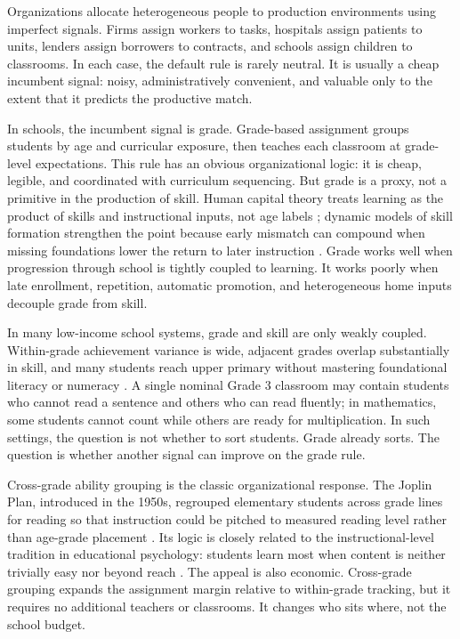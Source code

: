 \documentclass[11pt]{article}
\begin{document}
Organizations allocate heterogeneous people to production environments using imperfect signals. Firms assign workers to tasks, hospitals assign patients to units, lenders assign borrowers to contracts, and schools assign children to classrooms. In each case, the default rule is rarely neutral. It is usually a cheap incumbent signal: noisy, administratively convenient, and valuable only to the extent that it predicts the productive match.

In schools, the incumbent signal is grade. Grade-based assignment groups students by age and curricular exposure, then teaches each classroom at grade-level expectations. This rule has an obvious organizational logic: it is cheap, legible, and coordinated with curriculum sequencing. But grade is a proxy, not a primitive in the production of skill. Human capital theory treats learning as the product of skills and instructional inputs, not age labels \citep{benporath1967}; dynamic models of skill formation strengthen the point because early mismatch can compound when missing foundations lower the return to later instruction \citep{cunhaheckman2007}. Grade works well when progression through school is tightly coupled to learning. It works poorly when late enrollment, repetition, automatic promotion, and heterogeneous home inputs decouple grade from skill.

In many low-income school systems, grade and skill are only weakly coupled. Within-grade achievement variance is wide, adjacent grades overlap substantially in skill, and many students reach upper primary without mastering foundational literacy or numeracy \citep{banerjee/cole/duflo/linden:2007,muralidharan2019disrupting}. A single nominal Grade 3 classroom may contain students who cannot read a sentence and others who can read fluently; in mathematics, some students cannot count while others are ready for multiplication. In such settings, the question is not whether to sort students. Grade already sorts. The question is whether another signal can improve on the grade rule.

Cross-grade ability grouping is the classic organizational response. The Joplin Plan, introduced in the 1950s, regrouped elementary students across grade lines for reading so that instruction could be pitched to measured reading level rather than age-grade placement \citep{floyd:1954}. Its logic is closely related to the instructional-level tradition in educational psychology: students learn most when content is neither trivially easy nor beyond reach \citep{betts1946,vygotsky1978}. The appeal is also economic. Cross-grade grouping expands the assignment margin relative to within-grade tracking, but it requires no additional teachers or classrooms. It changes who sits where, not the school budget.
\end{document}
